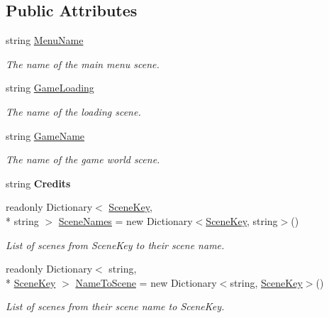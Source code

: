 \subsection*{Public Attributes}
\begin{DoxyCompactItemize}
\item 
string \hyperlink{class_skyrates_1_1_scene_1_1_scene_data_ac0464dba79d7d798be14890ee3cb7d61}{Menu\-Name}
\begin{DoxyCompactList}\small\item\em The name of the main menu scene. \end{DoxyCompactList}\item 
string \hyperlink{class_skyrates_1_1_scene_1_1_scene_data_af9bf03f2461a84057c302ea314488394}{Game\-Loading}
\begin{DoxyCompactList}\small\item\em The name of the loading scene. \end{DoxyCompactList}\item 
string \hyperlink{class_skyrates_1_1_scene_1_1_scene_data_a746579eb4c6d258f752b66c122891f4d}{Game\-Name}
\begin{DoxyCompactList}\small\item\em The name of the game world scene. \end{DoxyCompactList}\item 
\hypertarget{class_skyrates_1_1_scene_1_1_scene_data_a726a530d3916f1f54f3f3b381af59e69}{string {\bfseries Credits}}\label{class_skyrates_1_1_scene_1_1_scene_data_a726a530d3916f1f54f3f3b381af59e69}

\item 
readonly Dictionary$<$ \hyperlink{class_skyrates_1_1_scene_1_1_scene_data_a466c9423ed3d053f5513e19abcf76b75}{Scene\-Key}, \\*
string $>$ \hyperlink{class_skyrates_1_1_scene_1_1_scene_data_a35a18084f2186d9e25993bdc1f3c774a}{Scene\-Names} = new Dictionary$<$\hyperlink{class_skyrates_1_1_scene_1_1_scene_data_a466c9423ed3d053f5513e19abcf76b75}{Scene\-Key}, string$>$()
\begin{DoxyCompactList}\small\item\em List of scenes from Scene\-Key to their scene name. \end{DoxyCompactList}\item 
readonly Dictionary$<$ string, \\*
\hyperlink{class_skyrates_1_1_scene_1_1_scene_data_a466c9423ed3d053f5513e19abcf76b75}{Scene\-Key} $>$ \hyperlink{class_skyrates_1_1_scene_1_1_scene_data_a86621efde09f0912b1341bde02da2b99}{Name\-To\-Scene} = new Dictionary$<$string, \hyperlink{class_skyrates_1_1_scene_1_1_scene_data_a466c9423ed3d053f5513e19abcf76b75}{Scene\-Key}$>$()
\begin{DoxyCompactList}\small\item\em List of scenes from their scene name to Scene\-Key. \end{DoxyCompactList}\end{DoxyCompactItemize}


